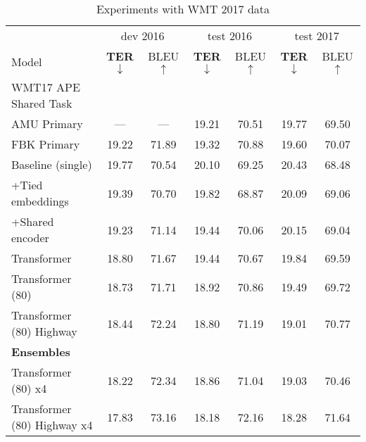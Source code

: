 \documentclass{article}
\begin{document}
\begin{table*}[t]
\centering
\begin{tabular}{p{5.5cm}cccccc}
\toprule
& \multicolumn{2}{c}{dev 2016} & \multicolumn{2}{c}{test 2016} & \multicolumn{2}{c}{test 2017}\\
Model & \textbf{TER$\downarrow$} & BLEU$\uparrow$ & \textbf{TER$\downarrow$} & BLEU$\uparrow$ & \textbf{TER$\downarrow$} & BLEU$\uparrow$ \\

\midrule
WMT17 APE Shared Task\\
\quad AMU Primary &   --- &   --- & 19.21 & 70.51 & 19.77 & 69.50 \\
\quad FBK Primary & 19.22 & 71.89 & 19.32 & 70.88 & 19.60 & 70.07 \\

\midrule
Baseline (single) & 19.77 & 70.54 & 20.10 & 69.25 & 20.43	 & 68.48 \\
\quad +Tied embeddings & 19.39 & 70.70 & 19.82 & 68.87 & 20.09 & 69.06 \\
\quad +Shared encoder & 19.23 & 71.14 & 19.44 & 70.06 & 20.15 & 69.04 \\ \midrule
Transformer & 18.80 & 71.67 & 19.44 & 70.67 & 19.84 & 69.59 \\
Transformer (80) & 18.73 & 71.71 & 18.92 & 70.86 & 19.49 & 69.72 \\ 
Transformer (80) Highway & 18.44 & 72.24 & 18.80 & 71.19 & 19.01 & 70.77 \\ \midrule
\bf Ensembles\\[2mm]
Transformer (80) x4 & 18.22 & 72.34 & 18.86 & 71.04 & 19.03 & 70.46 \\
Transformer (80) Highway x4 & 17.83 & 73.16 & 18.18 & 72.16 & 18.28 & 71.64 \\

\bottomrule
\end{tabular}
\caption{Experiments with WMT 2017 data}\label{tab:results}
\end{table*}
\end{document}
